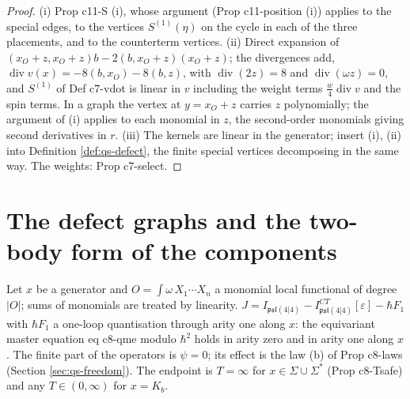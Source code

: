 \documentclass[11pt]{article}
\numberwithin{equation}{section}
\theoremstyle{plain}
\theoremstyle{definition}
\begin{document}
\begin{proof}
(i) Prop c11-S (i), whose argument (Prop c11-position (i)) applies to the special edges, to the vertices $S^{(1)}(\eta)$ on the cycle in each of the three placements, and to the counterterm vertices. (ii) Direct expansion of $(x_O+z,x_O+z)b-2(b,x_O+z)(x_O+z)$; the divergences add, $\operatorname{div}v(x)=-8(b,x_O)-8(b,z)$, with $\operatorname{div}(2z)=8$ and $\operatorname{div}(\omega z)=0$, and $S^{(1)}$ of Def c7-vdot is linear in $v$ including the weight terms $\tfrac w4\operatorname{div}v$ and the spin terms. In a graph the vertex at $y=x_O+z$ carries $z$ polynomially; the argument of (i) applies to each monomial in $z$, the second-order monomials giving second derivatives in $r$. (iii) The kernels are linear in the generator; insert (i), (ii) into Definition \ref{def:qs-defect}, the finite special vertices decomposing in the same way. The weights: Prop c7-select.
\end{proof}

\section{The defect graphs and the two-body form of the components}
\label{sec:qs-classes}

Let $x$ be a generator and $O=\int\omega\,X_1\cdots X_n$ a monomial local functional of degree $|O|$; sums of monomials are treated by linearity. $J=I_{\mathfrak{psl}(4|4)}-I^{CT}_{\mathfrak{psl}(4|4)}[\varepsilon]-\hbar F_1$ with $\hbar F_1$ a one-loop quantisation through arity one along $x$: the equivariant master equation eq c8-qme modulo $\hbar^2$ holds in arity zero and in arity one along $x$. The finite part of the operators is $\psi=0$; its effect is the law (b) of Prop c8-laws (Section \ref{sec:qs-freedom}). The endpoint is $T=\infty$ for $x\in\Sigma\cup\Sigma^*$ (Prop c8-Tsafe) and any $T\in(0,\infty)$ for $x=K_b$.
\end{document}
